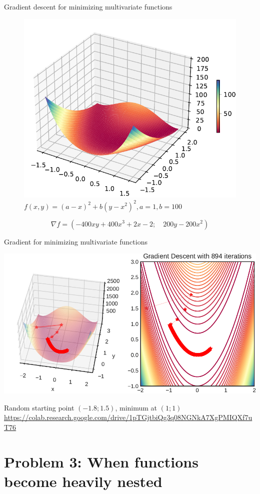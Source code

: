 \documentclass[12pt,aspectratio=169,handout]{beamer}
\begin{document}
\begin{frame}{Gradient descent for minimizing multivariate functions}
	
	\begin{figure}
		\centering
		\includegraphics[width=0.40\linewidth]{img/rosenbrock.pdf}
		\caption{$f(x,y)=(a-x)^{2}+b(y-x^{2})^{2}, a = 1, b = 100$}
	\end{figure}
	$$\nabla f = \left(-400xy+400x^3+2x-2; \quad 200y-200x^2 \right)$$
	
\end{frame}

\begin{frame}{Gradient for minimizing multivariate functions}
	
	\includegraphics[width=0.86\linewidth]{img/gradient1.pdf}
	
	Random starting point $(-1.8; 1.5)$, minimum at $(1; 1)$ \\

{\tiny \url{https://colab.research.google.com/drive/1pTGjtbiQg3q08NGNkA7XgPMIQXf7uT76}}

	
\end{frame}

\section{Problem 3: When functions become heavily nested}
\end{document}
